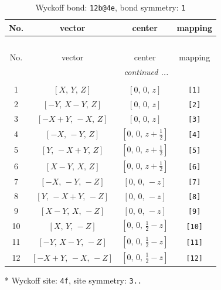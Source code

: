 \documentclass[fleqn,8pt]{jsarticle}
\begin{document}
\begin{longtable}{cccc}
\caption{Wyckoff bond: {\tt 12b@4e}, bond symmetry: {\tt 1}}
 \\
 \hline \hline
No. & vector & center & mapping \\ \hline \endfirsthead

\multicolumn{3}{l}{\tablename\ \thetable{}} \\
 \hline \hline
No. & vector & center & mapping \\ \hline \endhead

 \hline \hline
\multicolumn{3}{r}{\footnotesize\it continued ...} \\ \endfoot

 \hline \hline
\multicolumn{3}{r}{} \\ \endlastfoot

1 & $\left[ X,\, Y,\, Z \right]$ & $\left[ 0,\, 0,\, z \right]$ & {\tt [1]} \\ \hline
2 & $\left[ - Y,\, X - Y,\, Z \right]$ & $\left[ 0,\, 0,\, z \right]$ & {\tt [2]} \\ \hline
3 & $\left[ - X + Y,\, - X,\, Z \right]$ & $\left[ 0,\, 0,\, z \right]$ & {\tt [3]} \\ \hline
4 & $\left[ - X,\, - Y,\, Z \right]$ & $\left[ 0,\, 0,\, z + \frac{1}{2} \right]$ & {\tt [4]} \\ \hline
5 & $\left[ Y,\, - X + Y,\, Z \right]$ & $\left[ 0,\, 0,\, z + \frac{1}{2} \right]$ & {\tt [5]} \\ \hline
6 & $\left[ X - Y,\, X,\, Z \right]$ & $\left[ 0,\, 0,\, z + \frac{1}{2} \right]$ & {\tt [6]} \\ \hline
7 & $\left[ - X,\, - Y,\, - Z \right]$ & $\left[ 0,\, 0,\, - z \right]$ & {\tt [7]} \\ \hline
8 & $\left[ Y,\, - X + Y,\, - Z \right]$ & $\left[ 0,\, 0,\, - z \right]$ & {\tt [8]} \\ \hline
9 & $\left[ X - Y,\, X,\, - Z \right]$ & $\left[ 0,\, 0,\, - z \right]$ & {\tt [9]} \\ \hline
10 & $\left[ X,\, Y,\, - Z \right]$ & $\left[ 0,\, 0,\, \frac{1}{2} - z \right]$ & {\tt [10]} \\ \hline
11 & $\left[ - Y,\, X - Y,\, - Z \right]$ & $\left[ 0,\, 0,\, \frac{1}{2} - z \right]$ & {\tt [11]} \\ \hline
12 & $\left[ - X + Y,\, - X,\, - Z \right]$ & $\left[ 0,\, 0,\, \frac{1}{2} - z \right]$ & {\tt [12]} \\
\end{longtable}
* Wyckoff site: {\tt 4f}, site symmetry: {\tt 3..}
\end{document}
